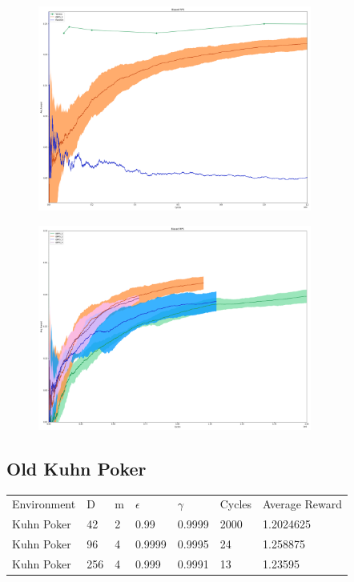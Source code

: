 \documentclass{article}
\theoremstyle{definition}
\newtheorem{primary statistics}[definition]{Primary Statistics}
\newtheorem{auxiliary statistics}[definition]{Auxiliary Statistics}
\begin{document}
\begin{figure}[h]
\centering
    \includegraphics[width=9cm]{RvVvU_Biased_RPS}
\end{figure}

 \begin{figure}[h]
 \centering
    \includegraphics[width=9cm]{BT_Biased_RPS}
\end{figure}


\newpage

\subsection{Old Kuhn Poker}

\begin{tabular}{lllllll}
\centering
Environment & D & m & $\epsilon$ & $\gamma$ & Cycles & Average Reward \\
Kuhn Poker  & 42        & 2           & 0.99        & 0.9999            & 2000   & 1.2024625        \\
Kuhn Poker  & 96        & 4           & 0.9999      & 0.9995            & 24     & 1.258875         \\
Kuhn Poker  & 256       & 4           & 0.999       & 0.9991            & 13     & 1.23595         \\
\end{tabular}
\end{document}
